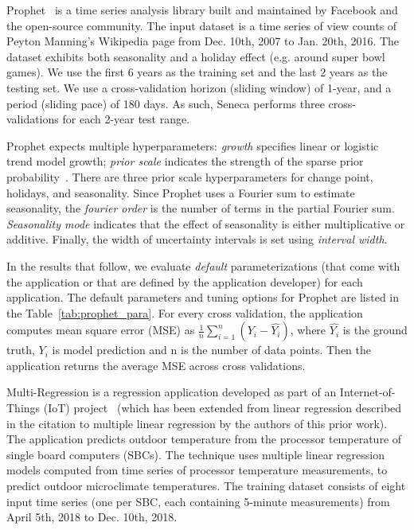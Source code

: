 Prophet~\cite{ref:prophet} is a time series analysis library built and maintained by Facebook and the open-source community. The input dataset is a time series of view counts
of Peyton Manning's Wikipedia page from Dec. 10th, 2007 to Jan. 20th, 2016. 
The dataset exhibits both seasonality and a holiday effect (e.g. around 
super bowl games). 
We use the first 6 years as the training set and the last 2 years as the testing set.  We use a cross-validation horizon (sliding window) of 1-year, 
and a period (sliding pace) 
of 180 days.  As such, Seneca performs three cross-validations for each 2-year test range.

Prophet expects multiple hyperparameters: \textit{growth} specifies linear or logistic trend model growth; \textit{prior scale} indicates the strength of the 
sparse prior probability~\cite{ref:sparse_prior}. 
There are three prior scale hyperparameters for change point, holidays, and seasonality. 
Since Prophet uses a Fourier sum to estimate seasonality, 
the \textit{fourier order} is the number of terms in the partial Fourier 
sum. \textit{Seasonality mode} indicates that the effect of seasonality is either 
multiplicative or additive. Finally, the width of uncertainty intervals 
is set using \textit{interval width}.

In the results that follow, we evaluate \textit{default} parameterizations (that come with 
the application or that are defined by the application developer) for each application.  
The default parameters and tuning options for Prophet are listed in the Table~\ref{tab:prophet_para}. For every cross validation, the application computes mean square error (MSE) as $\frac{1}{n}\sum_{i=1}^{n}(Y_i - \hat{Y_i})$, where $\hat{Y_i}$ is the ground truth, $Y_i$ is model prediction and n is the number of data points. Then the application returns the average MSE across cross validations. 


Multi-Regression is a regression application developed as part of
an Internet-of-Things (IoT) project~\cite{iot-cpu} (which has been
extended from linear regression described in the citation 
to multiple linear regression by the authors of this prior work).
The application predicts outdoor temperature from the processor 
temperature of single board computers (SBCs).  
The technique uses multiple linear regression models computed from time
series of processor temperature measurements,
to predict outdoor microclimate temperatures. 
The training dataset consists of eight input time 
series (one per SBC, each containing 
5-minute measurements) from April 5th, 2018 to Dec. 10th, 2018.

